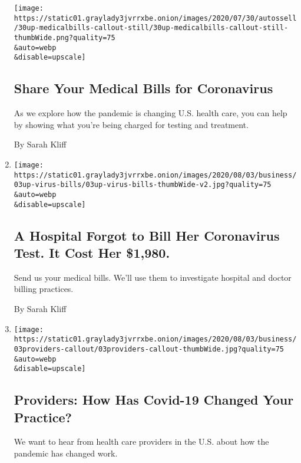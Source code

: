 \begin{enumerate}
  \texttt{[image: https://static01.graylady3jvrrxbe.onion/images/2020/07/30/autossell/30up-medicalbills-callout-still/30up-medicalbills-callout-still-thumbWide.png?quality=75\\\&auto=webp\\\&disable=upscale]}

  \hypertarget{share-your-medical-bills-for-coronavirus}{%
  \subsection{Share Your Medical Bills for
  Coronavirus}\label{share-your-medical-bills-for-coronavirus}}

  As we explore how the pandemic is changing U.S. health care, you can
  help by showing what you're being charged for testing and treatment.

  By Sarah Kliff
\item
  \href{/2020/08/03/upshot/nj-coronavirus-medical-bill.html}{}

  \texttt{[image: https://static01.graylady3jvrrxbe.onion/images/2020/08/03/business/03up-virus-bills/03up-virus-bills-thumbWide-v2.jpg?quality=75\\\&auto=webp\\\&disable=upscale]}

  \hypertarget{a-hospital-forgot-to-bill-her-coronavirus-test-it-cost-her-1980-1}{%
  \subsection{A Hospital Forgot to Bill Her Coronavirus Test. It Cost
  Her
  \$1,980.}\label{a-hospital-forgot-to-bill-her-coronavirus-test-it-cost-her-1980-1}}

  Send us your medical bills. We'll use them to investigate hospital and
  doctor billing practices.

  By Sarah Kliff
\item
  \href{/2020/08/03/reader-center/healthcare-workers-coronavirus-care.html}{}

  \texttt{[image: https://static01.graylady3jvrrxbe.onion/images/2020/08/03/business/03providers-callout/03providers-callout-thumbWide.jpg?quality=75\\\&auto=webp\\\&disable=upscale]}

  \hypertarget{providers-how-has-covid-19-changed-your-practice}{%
  \subsection{Providers: How Has Covid-19 Changed Your
  Practice?}\label{providers-how-has-covid-19-changed-your-practice}}

  We want to hear from health care providers in the U.S. about how the
  pandemic has changed work.


\end{enumerate}
